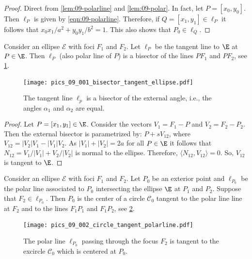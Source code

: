 \begin{proof} Direct from \cref{lem:09-polarline} and \cref{lem:09-polar}. In fact, let $P=[x_0,y_0]$. Then $\ell_P$ is given by \cref{eqn:09-polarline}. Therefore, if $Q=[x_1,y_1]\in \ell_P$ it follows that
$x_0x_1/a^2+y_0y_1/b^2=1$. This also shows that $P_0\in \ell_Q.$
\end{proof}

\begin{proposition}
    Consider an ellipse $\mathcal{E}$ with foci $F_1$ and $F_2$. Let $\ell_P$ be the tangent line to $\E$ at $P\in \E$. Then $\ell_P$ (also polar line of $P$)  is a bisector of the   lines $PF_1$ and $PF_2$, see \cref{fig:bisectorline}.  
    \label{prop:09-bisectorline}
\end{proposition}
\begin{figure} 
	\begin{center}
		 \texttt{[image: pics\_09\_001\_bisector\_tangent\_ellipse.pdf]}
		\caption {The tangent line $\ell_p$ is a bisector of the external angle, i.e., the angles $\alpha_1$ and $\alpha_2$ are equal. 	\label{fig:bisectorline} }
	\end{center}

\end{figure}

\begin{proof} Let $P=[x_1,y_1]\in \E$. Consider the vectors $V_1=F_1-P$ and $V_2=F_2-P_2$.
Then the external bisector  is parametrized by:  $P+sV_{12}$, where $V_{12}=|V_2|V_1-|V_1|V_2$. As $|V_1|+|V_2|=2a$ for all $P\in \E$ it follows that $N_{12}=V_1/|V_1|+V_2/|V_2|$ is normal to the ellipse. Therefore, $\langle N_{12},V_{12}\rangle=0$. So,
$V_{12}$ is tangent to $\E$.
\end{proof}


\begin{proposition}\label{prop:circle_polarline}
    Consider an ellipse $\mathcal{E}$ with foci $F_1$ and $F_2$. Let $ P_0 $ be an exterior point and $\ell_{P_0}$ be the polar line associated to $P_0$ intersecting the ellipse $\E$ at $P_1$ and $P_2$. Suppose that $F_2\in \ell_{P_0}$. Then $P_0$ is  the center of a circle $\mathcal{C}_0$  tangent to the polar line line at $F_2$ and to the lines $F_1P_1$ and $F_1P_2$,   see \cref{fig:circle_polarline}.  
\end{proposition}
\begin{figure} 
	\begin{center}
		 \texttt{[image: pics\_09\_002\_circle\_tangent\_polarline.pdf]}
		\caption {The polar line $\ell_{P_0}$ passing through the focus $F_2$ is tangent to the excircle $\mathcal{C}_0$ which is centered at $P_0$.	\label{fig:circle_polarline} }
	\end{center}

\end{figure}

